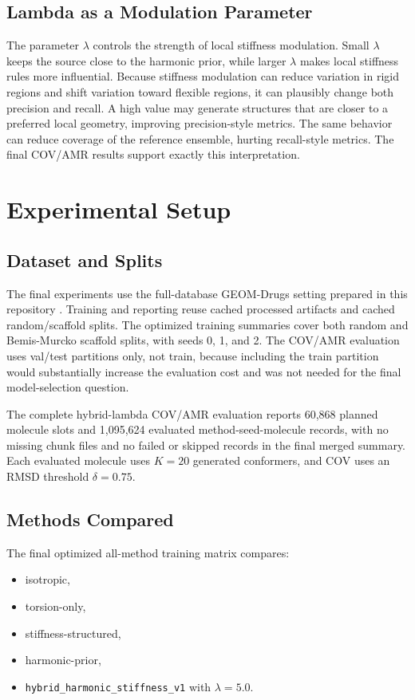 \documentclass[11pt]{article}
\begin{document}
\subsection{Lambda as a Modulation Parameter}

The parameter $\lambda$ controls the strength of local stiffness modulation. Small $\lambda$ keeps the source close to the harmonic prior, while larger $\lambda$ makes local stiffness rules more influential. Because stiffness modulation can reduce variation in rigid regions and shift variation toward flexible regions, it can plausibly change both precision and recall. A high value may generate structures that are closer to a preferred local geometry, improving precision-style metrics. The same behavior can reduce coverage of the reference ensemble, hurting recall-style metrics. The final COV/AMR results support exactly this interpretation.

\section{Experimental Setup}

\subsection{Dataset and Splits}

The final experiments use the full-database GEOM-Drugs setting prepared in this repository \cite{geom}. Training and reporting reuse cached processed artifacts and cached random/scaffold splits. The optimized training summaries cover both random and Bemis-Murcko scaffold splits, with seeds 0, 1, and 2. The COV/AMR evaluation uses val/test partitions only, not train, because including the train partition would substantially increase the evaluation cost and was not needed for the final model-selection question.

The complete hybrid-lambda COV/AMR evaluation reports 60,868 planned molecule slots and 1,095,624 evaluated method-seed-molecule records, with no missing chunk files and no failed or skipped records in the final merged summary. Each evaluated molecule uses $K=20$ generated conformers, and COV uses an RMSD threshold $\delta=0.75$.

\subsection{Methods Compared}

The final optimized all-method training matrix compares:
\begin{itemize}
    \item isotropic,
    \item torsion-only,
    \item stiffness-structured,
    \item harmonic-prior,
    \item \texttt{hybrid\_harmonic\_stiffness\_v1} with $\lambda=5.0$.
\end{itemize}
\end{document}
